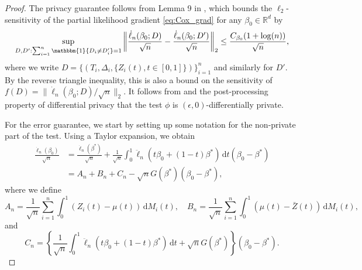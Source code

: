 \documentclass[11pt]{article}
\newcommand{\dint}{\,\mathrm{d}}
\begin{document}
\begin{proof}
The privacy guarantee follows from Lemma 9 in \cite{FDPCox}, which bounds the $\ell_2$-sensitivity of the partial likelihood gradient \eqref{eq:Cox_grad} for any $\beta_0 \in \mathbb{R}^d$ by 
\begin{equation*}
    \sup_{D, D': \sum_{i=1}^n \mathbbm{1}\{D_i \neq D_i'\} = 1} \left\| \frac{\dot{\ell}_n(\beta_0; D)}{\sqrt{n}} - \frac{\dot{\ell}_n(\beta_0; D')}{\sqrt{n}} \right\|_2 \leq \frac{C_{\beta_0} (1+\log(n))}{\sqrt{n}},
\end{equation*}
where we write $D = \{(T_i, \Delta_i, \{Z_i(t), t \in [0, 1]\})\}_{i=1}^n$ and similarly for $D'$. By the reverse triangle inequality, this is also a bound on the sensitivity of $f(D) = \|\dot{\ell}_n(\beta_0; D)/\sqrt{n}\|_2$. It follows from  and the post-processing property of differential privacy \citep[e.g.~Proposition 2.1 in][]{dwork2014algorithmic} that the test $\phi$ is $(\epsilon, 0)$-differentially private.

For the error guarantee, we start by setting up some notation for the non-private part of the test. Using a Taylor expansion, we obtain
\begin{align*}
    \frac{\dot{\ell}_n(\beta_0)}{\sqrt{n}} &= \frac{\dot{\ell}_n(\beta^*)}{\sqrt{n}} +  \frac{1}{\sqrt{n}}\int_0^1 \ddot{\ell}_n(t\beta_0 + (1-t)\beta^*) \dint t (\beta_0 - \beta^*) \\
    &= A_n + B_n + C_n - \sqrt{n}G(\beta^*)(\beta_0-\beta^*),
\end{align*}
where we define 
\begin{equation*}
    A_n = \frac{1}{\sqrt{n}}\sum_{i=1}^n \int_0^1 (Z_i(t) - \mu(t)) \dint M_i(t), \quad B_n = \frac{1}{\sqrt{n}}\sum_{i=1}^n \int_0^1 (\mu(t) - \bar{Z}(t)) \dint M_i(t),
\end{equation*}
and 
\begin{equation*}
    C_n = \left\{\frac{1}{\sqrt{n}} \int_0^1 \ddot{\ell}_n(t\beta_0 + (1-t)\beta^*) \dint t + \sqrt{n} G(\beta^*)\right\} (\beta_0 - \beta^*).
\end{equation*}


\end{proof}
\end{document}
